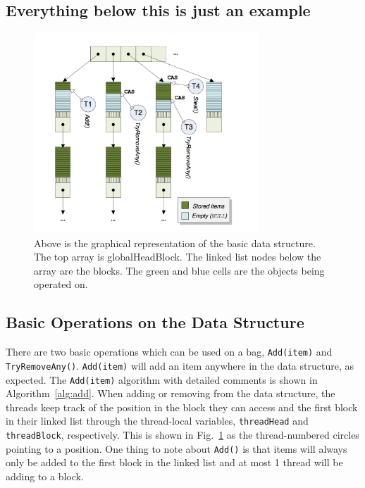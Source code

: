 \newpage

\subsection{Everything below this is just an example}


\begin{figure}
\centering{}
\includegraphics[width=0.75\textwidth]{datastructure.png}
\caption{\label{fig:datastruct}Above is the graphical representation of the basic data structure. The top array is globalHeadBlock. The linked list nodes below the array are the blocks. The green and blue cells are the objects being operated on.}
\end{figure}

\subsection{Basic Operations on the Data Structure}

There are two basic operations which can be used on a bag, \texttt{Add(item)} and \texttt{TryRemoveAny()}.
\texttt{Add(item)} will add an item anywhere in the data structure, as expected.
The \texttt{Add(item)} algorithm with detailed comments is shown in Algorithm~\ref{alg:add}.
When adding or removing from the data structure, the threads keep track of the position in the block they can access
and the first block in their linked list through the thread-local variables, \texttt{threadHead}
and \texttt{threadBlock}, respectively. This is shown in Fig.~\ref{fig:datastruct} as the thread-numbered
circles pointing to a position. One thing to note about \texttt{Add()} is that items will always
only be added to the first block in the linked list and at most 1 thread will be adding to a block.

